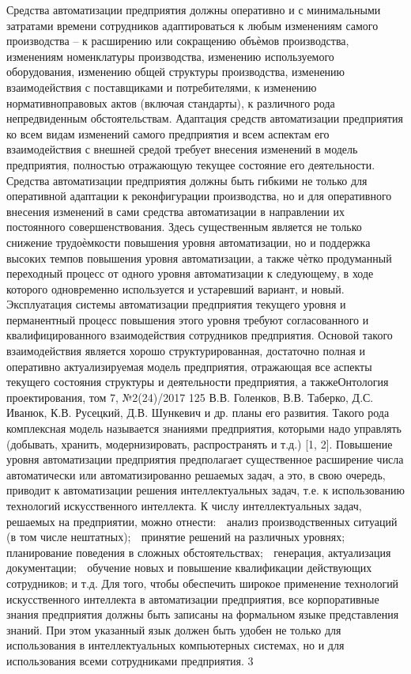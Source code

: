 Средства автоматизации предприятия должны оперативно и с минимальными затратами
времени сотрудников адаптироваться к любым изменениям самого производства – к расширению или сокращению объѐмов производства, изменениям номенклатуры производства,
изменению используемого оборудования, изменению общей структуры производства, изменению взаимодействия с поставщиками и потребителями, к изменению нормативноправовых актов (включая стандарты), к различного рода непредвиденным обстоятельствам.
Адаптация средств автоматизации предприятия ко всем видам изменений самого предприятия и всем аспектам его взаимодействия с внешней средой требует внесения изменений в
модель предприятия, полностью отражающую текущее состояние его деятельности.
Средства автоматизации предприятия должны быть гибкими не только для оперативной
адаптации к реконфигурации производства, но и для оперативного внесения изменений в сами средства автоматизации в направлении их постоянного совершенствования. Здесь существенным является не только снижение трудоѐмкости повышения уровня автоматизации, но
и поддержка высоких темпов повышения уровня автоматизации, а также чѐтко продуманный
переходный процесс от одного уровня автоматизации к следующему, в ходе которого одновременно используется и устаревший вариант, и новый.
Эксплуатация системы автоматизации предприятия текущего уровня и перманентный
процесс повышения этого уровня требуют согласованного и квалифицированного взаимодействия сотрудников предприятия. Основой такого взаимодействия является хорошо структурированная, достаточно полная и оперативно актуализируемая модель предприятия, отражающая все аспекты текущего состояния структуры и деятельности предприятия, а такжеОнтология проектирования, том 7, №2(24)/2017 125
В.В. Голенков, В.В. Таберко, Д.С. Иванюк, К.В. Русецкий, Д.В. Шункевич и др.
планы его развития. Такого рода комплексная модель называется знаниями предприятия, которыми надо управлять (добывать, хранить, модернизировать, распространять и т.д.) [1, 2].
Повышение уровня автоматизации предприятия предполагает существенное расширение
числа автоматически или автоматизированно решаемых задач, а это, в свою очередь, приводит к автоматизации решения интеллектуальных задач, т.е. к использованию технологий искусственного интеллекта. К числу интеллектуальных задач, решаемых на предприятии, можно отнести:
 анализ производственных ситуаций (в том числе нештатных);
 принятие решений на различных уровнях;
 планирование поведения в сложных обстоятельствах;
 генерация, актуализация документации;
 обучение новых и повышение квалификации действующих сотрудников; и т.д.
Для того, чтобы обеспечить широкое применение технологий искусственного интеллекта
в автоматизации предприятия, все корпоративные знания предприятия должны быть записаны на формальном языке представления знаний. При этом указанный язык должен быть удобен не только для использования в интеллектуальных компьютерных системах, но и для использования всеми сотрудниками предприятия.
3

